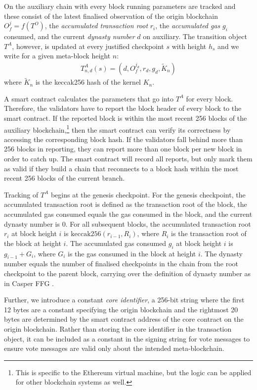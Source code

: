 \documentclass[12pt,a4paper]{article}
\begin{document}
On the auxiliary chain with every block running parameters are tracked and these consist of the latest finalised observation of the origin blockchain $O^j_f= f(T^O)$, the \emph{accumulated transaction root} $r_i$, the \emph{accumulated gas} $g_i$ consumed, and the current \emph{dynasty number} $d$ on auxiliary.
The transition object $T^A$, however, is updated at every justified checkpoint $s$ with height $h_s$ and we write for a given meta-block height $n$:
\begin{align*}
  T^A_{n,d}(s) = (d, O^{j_d}_f, r_d, g_d, \tilde{K}_n)
\end{align*}
where $\tilde{K}_n$ is the keccak256 hash of the kernel $K_n$.

A smart contract calculates the parameters that go into $T^A$ for every block.
Therefore, the validators have to report the block header of every block to the smart contract.
If the reported block is within the most recent 256 blocks of the auxiliary blockchain,\footnote{
	This is specific to the Ethereum virtual machine, but the logic can be applied for other blockchain systems as well.
}
then the smart contract can verify its correctness by accessing the corresponding block hash.
If the validators fall behind more than 256 blocks in reporting, they can report more than one block per new block in order to catch up.
The smart contract will record all reports, but only mark them as valid if they build a chain that reconnects to a block hash within the most recent 256 blocks of the current branch.

Tracking of $T^A$ begins at the genesis checkpoint.
For the genesis checkpoint, the accumulated transaction root is defined as the transaction root of the block, the accumulated gas consumed equals the gas consumed in the block, and the current dynasty number is 0.
For all subsequent blocks, the accumulated transaction root $r_i$ at block height $i$ is $\text{keccak256}(r_{i-1}, R_i)$, where $R_i$ is the transaction root of the block at height $i$.
The accumulated gas consumed $g_i$ at block height $i$ is $g_{i-1} + G_i$, where $G_i$ is the gas consumed in the block at height $i$.
The dynasty number equals the number of finalised checkpoints in the chain from the root checkpoint to the parent block, carrying over the definition of dynasty number as in Casper FFG \cite{casperffg}.

Further, we introduce a constant \emph{core identifier}, a 256-bit string where the first 12 bytes are a constant specifying the origin blockchain and the rightmost 20 bytes are determined by the smart contract address of the core contract on the origin blockchain.
Rather than storing the core identifier in the transaction object, it can be included as a constant in the signing string for vote messages to ensure vote messages are valid only about the intended meta-blockchain.
\end{document}
